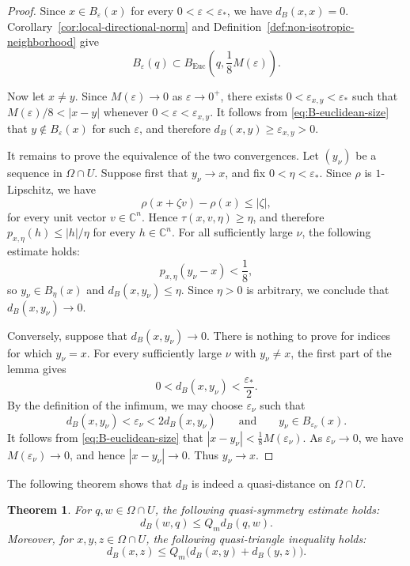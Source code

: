 \documentclass[11pt]{article}
\newtheorem{theorem}{Theorem}[section]
\theoremstyle{definition}
\newcommand{\C}{\mathbb{C}}
\newcommand{\eps}{\varepsilon}
\begin{document}
\begin{proof}
    Since \(x\in B_\eps(x)\) for every \(0<\eps<\eps_*\), we have
    \(d_B(x,x)=0\).  Corollary~\ref{cor:local-directional-norm} and
    Definition~\ref{def:non-isotropic-neighborhood} give
    \begin{equation}\label{eq:B-euclidean-size}
        B_\eps(q)
        \subset
        B_{\mathrm{Euc}}
        \left(q,\frac18M(\eps)\right).
    \end{equation}

    Now let \(x\ne y\). Since \(M(\eps)\to0\) as \(\eps\to0^+\), there exists
    \(0<\eps_{x,y}<\eps_*\) such that
    \(M(\eps)/8<|x-y|\) whenever \(0<\eps<\eps_{x,y}\).  It follows from
    \eqref{eq:B-euclidean-size} that \(y\notin B_\eps(x)\) for such
    \(\eps\), and therefore \(d_B(x,y)\ge\eps_{x,y}>0\).

    It remains to prove the equivalence of the two convergences.  Let
    \((y_\nu)\) be a sequence in \(\Omega\cap U\).  Suppose first that
    \(y_\nu\to x\), and fix \(0<\eta<\eps_*\).  Since \(\rho\) is
    \(1\)-Lipschitz, we have
    \[
    \rho(x+\zeta v)-\rho(x)\le|\zeta|,
    \]
    for every unit vector \(v\in\C^n\).  Hence
    \(\tau(x,v,\eta)\ge\eta\), and therefore
    \(p_{x,\eta}(h)\le |h|/\eta\) for every \(h\in\C^n\).  For all
    sufficiently large \(\nu\), the following estimate holds:
    \[
    p_{x,\eta}(y_\nu-x)<\frac18,
    \]
    so \(y_\nu\in B_\eta(x)\) and
    \(d_B(x,y_\nu)\le\eta\).  Since \(\eta>0\) is arbitrary, we conclude
    that \(d_B(x,y_\nu)\to0\).

    Conversely, suppose that \(d_B(x,y_\nu)\to0\).  There is nothing to
    prove for indices for which \(y_\nu=x\).  For every sufficiently large
    \(\nu\) with \(y_\nu\ne x\), the first part of the lemma gives
    \[
    0<d_B(x,y_\nu)<\frac{\eps_*}{2}.
    \]
    By the definition of the infimum, we may choose \(\eps_\nu\) such that
    \[
    d_B(x,y_\nu)<\eps_\nu<2d_B(x,y_\nu)
    \qquad\text{and}\qquad
    y_\nu\in B_{\eps_\nu}(x).
    \]
    It follows from \eqref{eq:B-euclidean-size} that
    \(|x-y_\nu|<\frac18M(\eps_\nu)\).
    As \(\eps_\nu\to0\), we have \(M(\eps_\nu)\to0\), and hence
    \(|x-y_\nu|\to0\). Thus \(y_\nu\to x\).
\end{proof}
The following theorem shows that \(d_B\) is indeed a quasi-distance on
\(\Omega\cap U\).
\begin{theorem}\label{thm:dB-quasi}
For \(q,w\in\Omega\cap U\), the following quasi-symmetry
estimate holds:
\begin{equation*}
d_B(w,q)
\le
Q_m d_B(q,w).
\end{equation*}
Moreover, for \(x,y,z\in\Omega\cap U\), the following
quasi-triangle inequality holds:
\begin{equation*}
d_B(x,z)
\le
Q_m\bigl(d_B(x,y)+d_B(y,z)\bigr).
\end{equation*}
\end{theorem}
\end{document}
